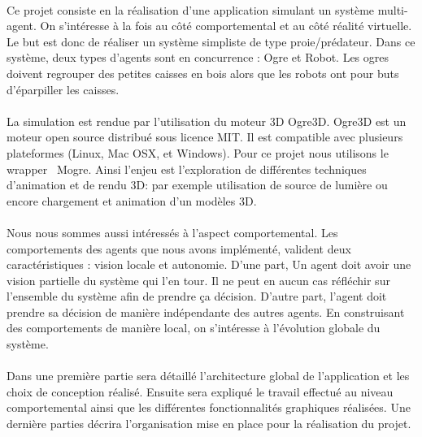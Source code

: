 \paragraph{}Ce projet consiste en la réalisation d'une application simulant un système
multi-agent. On s'intéresse à la fois au côté comportemental et au côté réalité virtuelle.
Le but est donc de réaliser un système simpliste de type proie/prédateur.
Dans ce système, deux types d'agents sont en concurrence : Ogre et Robot. Les
ogres doivent regrouper des petites caisses en bois alors que les robots ont
pour buts d'éparpiller les caisses.

\paragraph{}La simulation est rendue par l'utilisation du moteur 3D Ogre3D.
Ogre3D est un moteur open source distribué sous licence MIT. Il est compatible
avec plusieurs plateformes (Linux, Mac OSX, et Windows). Pour ce projet nous
utilisons le wrapper \CS~Mogre. Ainsi l'enjeu est l'exploration de différentes
techniques d'animation et de rendu 3D: par exemple utilisation de source de lumière ou 
encore chargement et animation d'un modèles 3D. 

\paragraph{}Nous nous sommes aussi intéressés à l'aspect comportemental. Les comportements 
des agents que nous avons implémenté, valident deux caractéristiques : vision locale et 
autonomie. D'une part, Un agent doit avoir une vision partielle du système qui l'en tour. 
Il ne peut en aucun cas réfléchir sur l'ensemble du système afin de prendre ça décision. 
D'autre part, l'agent doit prendre sa décision de manière indépendante des autres agents.
En construisant des comportements de manière local, on s'intéresse à l'évolution globale
du système.


\paragraph{} Dans une première partie sera détaillé l'architecture global de
l'application et les choix de conception réalisé. Ensuite sera expliqué le travail effectué
au niveau comportemental ainsi que les différentes fonctionnalités graphiques réalisées. Une
dernière parties décrira l'organisation mise en place pour la réalisation du projet.

